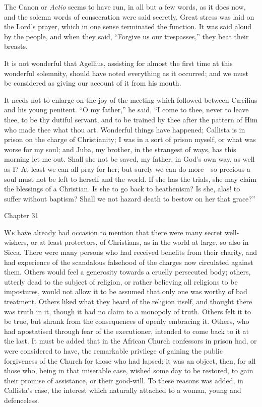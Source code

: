 The Canon or \emph{Actio} seems to have run, in all but a few
words, as it does now, and the solemn words of consecration were said
secretly. Great stress was laid on the Lord's prayer, which in one
sense terminated the function. It was said aloud by the people, and
when they said, ``Forgive us our trespasses,'' they beat their
breasts.

It is not wonderful that Agellius, assisting for almost the first
time at this wonderful solemnity, should have noted everything as it
occurred; and we must be considered as giving our account of it from
his mouth.

It needs not to enlarge on the joy of the meeting which followed
between Cæcilius and his young penitent. ``O my
father,'' he said, ``I come to thee, never to leave thee, to
be thy dutiful servant, and to be trained by thee after the pattern of
Him who made thee what thou art. Wonderful things have happened;
Callista is in prison on the charge of Christianity; I was in a sort
of prison myself, or what was worse for my soul; and Juba, my brother,
in the strangest of ways, has this morning let me out. Shall she not
be saved, my father, in God's own way, as well as I? At least we can
all pray for her; but surely we can do more—so precious a soul must
not be left to herself and the world. If she has the trials, she may
claim the blessings of a Christian. Is she to go back to heathenism?
Is she, alas! to suffer without baptism? Shall we not hazard death to
bestow on her that grace?''

Chapter 31


W\textsc{e} have already had occasion to mention that there were many
secret well-wishers, or at least protectors, of Christians, as in the
world at large, so also in Sicca. There were many persons who had
received benefits from their charity, and had experience of the
scandalous falsehood of the charges now circulated against them.
Others would feel a generosity towards a cruelly persecuted body;
others, utterly dead to the subject of religion, or rather believing
all religions to be impostures, would not allow it to be assumed that
only one was worthy of bad treatment. Others liked what they heard of
the religion itself, and thought there was truth in it, though it had
no claim to a monopoly of truth. Others felt it to be true, but shrank
from the consequences of openly embracing it. Others, who had
apostatised through fear of the executioner, intended to come back to
it at the last. It must be added that in the African Church confessors
in prison had, or were considered to have, the remarkable privilege of
gaining the public forgiveness of the Church for those who had lapsed;
it was an object, then, for all those who, being in that
miserable case, wished some day to be restored, to gain their promise
of assistance, or their good-will. To these reasons was added, in
Callista's case, the interest which naturally attached to a woman,
young and defenceless.

